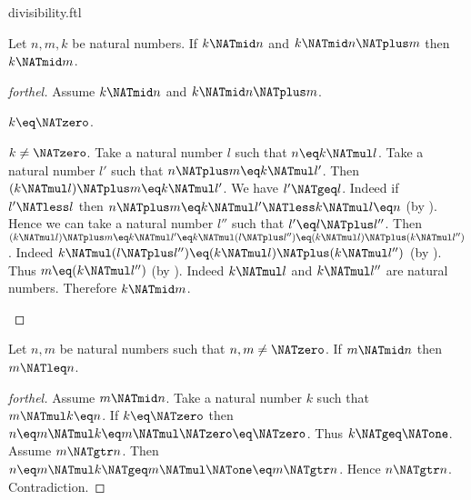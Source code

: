 \documentclass{naproche-library}
\begin{document}
\begin{smodule}[title=Divisibility]{divisibility.ftl}
\begin{proposition}[forthel,id=ARITHMETIC_07_1076947887063040]
  Let $n, m, k$ be natural numbers.
  If $k \NATmid n$ and $k \NATmid n \NATplus m$ then $k \NATmid m$.
\end{proposition}
\begin{proof}[forthel]
  Assume $k \NATmid n$ and $k \NATmid n \NATplus m$.

  \begin{case}{$k \eq \NATzero$.} \end{case}

  \begin{case}{$k \neq \NATzero$.}
    Take a natural number $l$ such that $n \eq k \NATmul l$.
    Take a natural number $l'$ such that $n \NATplus m \eq k \NATmul l'$.
    Then $(k \NATmul l) \NATplus m \eq k \NATmul l'$.
    We have $l' \NATgeq l$.
    Indeed if $l' \NATless l$ then
    $n \NATplus m
      \eq k \NATmul l'
      \NATless k \NATmul l
      \eq n$ (by ).
    Hence we can take a natural number $l''$ such that $l' \eq l \NATplus l''$.
    Then $(k \NATmul l) \NATplus m
      \eq k \NATmul l'
      \eq k \NATmul (l \NATplus l'')
      \eq (k \NATmul l) \NATplus (k \NATmul l'')$.
    Indeed $k \NATmul (l \NATplus l'') \eq (k \NATmul l) \NATplus (k \NATmul l'')$ (by ).
    Thus $m \eq (k \NATmul l'')$ (by ).
    Indeed $k \NATmul l$ and $k \NATmul l''$ are natural numbers.
    Therefore $k \NATmid m$.
  \end{case}
\end{proof}

\begin{proposition}[forthel,id=ARITHMETIC_07_2187144577679360]
  Let $n, m$ be natural numbers such that $n, m \neq \NATzero$.
  If $m \NATmid n$ then $m \NATleq n$.
\end{proposition}
\begin{proof}[forthel]
  Assume $m \NATmid n$.
  Take a natural number $k$ such that $m \NATmul k \eq n$.
  If $k \eq \NATzero$ then
  $n
    \eq m \NATmul k
    \eq m \NATmul \NATzero
    \eq \NATzero$.
  Thus $k \NATgeq \NATone$.
  Assume $m \NATgtr n$.
  Then $n
    \eq m \NATmul k
    \NATgeq m \NATmul \NATone
    \eq m
    \NATgtr n$.
  Hence $n \NATgtr n$.
  Contradiction.
\end{proof}
\end{smodule}
\end{document}
